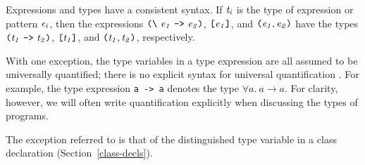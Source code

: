 
Expressions and types have a consistent syntax.
If \mbox{$\it t_i$} is the type of
expression or pattern \mbox{$\it e_i$}, then the expressions \mbox{$\it \makebox{\tt ({\char'134}}\ e_1\ \makebox{\tt ->}\ e_2\makebox{\tt )}$},
\mbox{$\it \makebox{\tt [}e_1\makebox{\tt ]}$}, and \mbox{$\it \makebox{\tt (}e_1,e_2\makebox{\tt )}$} have the types \mbox{$\it \makebox{\tt (}t_1\ \makebox{\tt ->}\ t_2\makebox{\tt )}$},
\mbox{$\it \makebox{\tt [}t_1\makebox{\tt ]}$}, and \mbox{$\it \makebox{\tt (}t_1,t_2\makebox{\tt )}$}, respectively.

With one exception, the type variables in a \Haskell{} type expression
are all assumed to be universally quantified; there is no explicit
syntax for universal quantification \cite{damas-milner82,reynolds90}.
For example, the type expression
\mbox{\tt a\ ->\ a} denotes the type $\forall a.~a \rightarrow a$.
For clarity, however, we will often write quantification explicitly
when discussing the types of \Haskell{} programs.

The exception referred to is that of the distinguished type variable
in a class declaration (Section~\ref{class-decls}).


